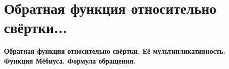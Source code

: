 \section{
 Обратная функция относительно свёртки... %
}

\textbf{Обратная функция относительно свёртки. Её мультипликативность. Функция Мёбиуса. Формула обращения.}
